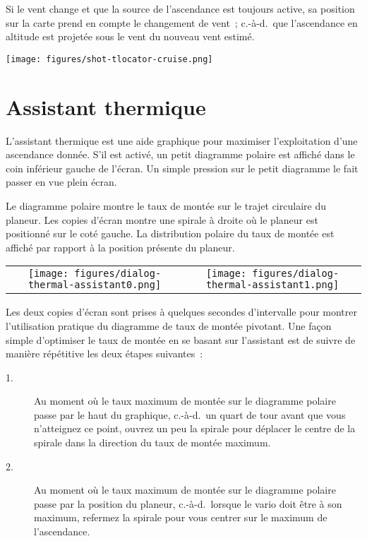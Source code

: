 Si le vent change et que la source de l'ascendance est toujours active, sa position sur la carte prend en compte le changement de vent~; c.-à-d.\ que l'ascendance en altitude est projetée sous le vent du nouveau vent estimé.

\begin{center}
\texttt{[image: figures/shot-tlocator-cruise.png]}
\end{center}


\section{Assistant thermique}\label{sec:thermal-assistant}

L'assistant thermique est une aide graphique pour maximiser l'exploitation d'une ascendance donnée.
S'il est activé,  un petit diagramme polaire est affiché dans le coin inférieur gauche de l'écran. Un simple pression sur le petit diagramme le fait passer en vue plein écran.

Le diagramme polaire montre le taux de montée sur le trajet circulaire du planeur.
Les copies d'écran montre une spirale à droite où le planeur est positionné sur le coté gauche.
La distribution polaire du taux de montée est affiché par rapport à la position présente du planeur.


\begin{tabular}{c c}
\texttt{[image: figures/dialog-thermal-assistant0.png]}&
\texttt{[image: figures/dialog-thermal-assistant1.png]}\\
\end{tabular}

Les deux copies d'écran sont prises à quelques secondes d'intervalle pour montrer l'utilisation pratique du diagramme de taux de montée pivotant.
Une façon simple d'optimiser le taux de montée en se basant sur l'assistant est de suivre de manière répétitive les deux étapes suivantes~:
\begin{description}
\item[1.]  Au moment où le taux maximum de montée sur le diagramme polaire passe par le haut du graphique, c.-à-d.\ un quart de tour avant que vous n'atteignez ce point, ouvrez un peu la spirale pour déplacer le centre de la spirale dans la direction du taux de montée maximum.
\item[2.]  Au moment où le taux maximum de montée sur le diagramme polaire passe par la position du planeur, c.-à-d.\ lorsque le vario doit être à son maximum, refermez la spirale pour vous centrer sur le maximum de l'ascendance.
\end{description}

